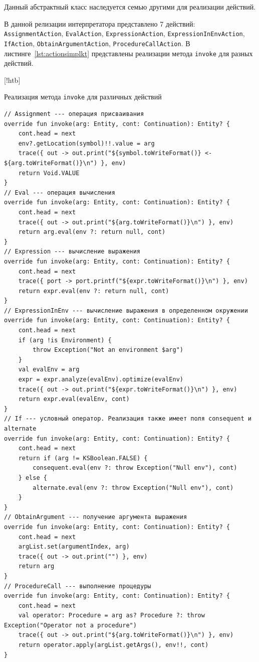 \documentclass[14pt, russian]{scrartcl}
\newenvironment{longlisting}{\captionsetup{type=listing}}{}
\begin{document}
Данный абстрактный класс наследуется семью другими для реализации действий.

В данной релизации интерпретатора представлено 7 действий: \texttt{AssignmentAction}, \texttt{EvalAction}, \texttt{ExpressionAction}, \texttt{ExpressionInEnvAction}, \texttt{IfAction}, \texttt{ObtainArgumentAction}, \texttt{ProcedureCallAction}. В листинге~\ref{lst:actionsimplkt} представлены реализации метода \texttt{invoke} для разных действий.

\begin{longlisting}[!htb]
\caption{Реализация метода \texttt{invoke} для различных действий}
\label{lst:actionsimplkt}
\begin{verbatim}
// Assignment --- операция присваивания
override fun invoke(arg: Entity, cont: Continuation): Entity? {
    cont.head = next
    env?.getLocation(symbol)!!.value = arg
    trace({ out -> out.print("${symbol.toWriteFormat()} <- ${arg.toWriteFormat()}\n") }, env)
    return Void.VALUE
}
// Eval --- операция вычисления
override fun invoke(arg: Entity, cont: Continuation): Entity? {
    cont.head = next
    trace({ out -> out.print("${arg.toWriteFormat()}\n") }, env)
    return arg.eval(env ?: return null, cont)
}
// Expression --- вычисление выражения
override fun invoke(arg: Entity, cont: Continuation): Entity? {
    cont.head = next
    trace({ port -> port.printf("${expr.toWriteFormat()}\n") }, env)
    return expr.eval(env ?: return null, cont)
}
// ExpressionInEnv --- вычисление выражения в определенном окружении
override fun invoke(arg: Entity, cont: Continuation): Entity? {
    cont.head = next
    if (arg !is Environment) {
        throw Exception("Not an environment $arg")
    }
    val evalEnv = arg
    expr = expr.analyze(evalEnv).optimize(evalEnv)
    trace({ out -> out.print("${expr.toWriteFormat()}\n") }, env)
    return expr.eval(evalEnv, cont)
}
// If --- условный оператор. Реализация также имеет поля consequent и alternate
override fun invoke(arg: Entity, cont: Continuation): Entity? {
    cont.head = next
    return if (arg != KSBoolean.FALSE) {
        consequent.eval(env ?: throw Exception("Null env"), cont)
    } else {
        alternate.eval(env ?: throw Exception("Null env"), cont)
    }
}
// ObtainArgument --- получение аргумента выражения
override fun invoke(arg: Entity, cont: Continuation): Entity? {
    cont.head = next
    argList.set(argumentIndex, arg)
    trace({ out -> out.print("") }, env)
    return arg
}
// ProcedureCall --- выполнение процедуры
override fun invoke(arg: Entity, cont: Continuation): Entity? {
    cont.head = next
    val operator: Procedure = arg as? Procedure ?: throw Exception("Operator not a procedure")
    trace({ out -> out.print("${arg.toWriteFormat()}\n") }, env)
    return operator.apply(argList.getArgs(), env!!, cont)
}
\end{verbatim}
\end{longlisting} %
\end{document}
